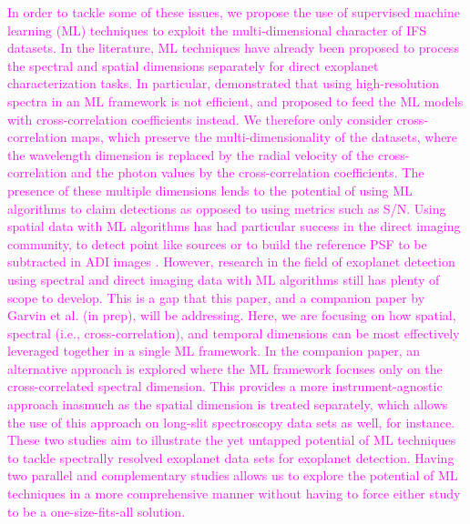 \documentclass[referee]{aa} %
\newcommand{\newchange}[1]{\textcolor{magenta}{#1}}
\begin{document}
\newchange{In order to tackle some of these issues, we propose the use of supervised machine learning (ML) techniques to exploit the multi-dimensional character of IFS datasets. In the literature, ML techniques have already been proposed to process the spectral and spatial dimensions separately for direct exoplanet characterization tasks. In particular, \citet{2020Fisher} demonstrated that using high-resolution spectra in an ML framework is not efficient, and proposed to feed the ML models with cross-correlation coefficients instead. 
We therefore only consider cross-correlation maps, which preserve the multi-dimensionality of the datasets, where the wavelength dimension is replaced by the radial velocity of the cross-correlation and the photon values by the cross-correlation coefficients.  The presence of these multiple dimensions lends to the potential of using ML algorithms to claim detections as opposed to using metrics such as S/N.}
\newchange{Using spatial data with ML algorithms has had particular success in the direct imaging community, to detect point like sources \citep{2018Gomez,2023Carlito} or to build the reference PSF to be subtracted in ADI images \citep{2022Gebhard,2023Flasseur}.}
\newchange{However, research in the field of exoplanet detection using spectral and direct imaging data with ML algorithms still has plenty of scope to develop. This is a gap that this paper, and a companion paper by Garvin et al. (in prep), will be addressing.
Here, we are focusing on how spatial, spectral (i.e., cross-correlation), and temporal dimensions can be most effectively leveraged together in a single ML framework. In the companion paper, an alternative approach is explored where the ML framework focuses only on the cross-correlated spectral dimension. This provides a more instrument-agnostic approach inasmuch as the spatial dimension is treated separately, which allows the use of this approach on long-slit spectroscopy data sets as well, for instance. These two studies aim to illustrate the yet untapped potential of ML techniques to tackle spectrally resolved exoplanet data sets for exoplanet detection.
Having two parallel and complementary studies allows us to explore the potential of ML techniques in a more comprehensive manner without having to force either study to be a one-size-fits-all solution.}
\end{document}

